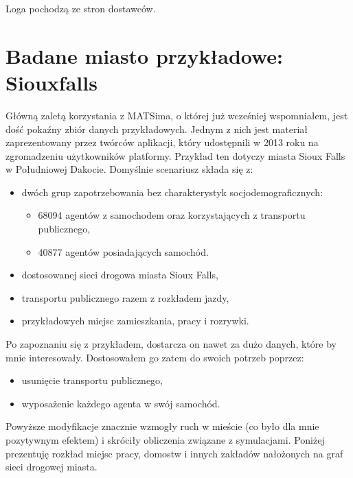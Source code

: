 \documentclass[twoside,12pt]{report}
\begin{document}
Loga pochodzą ze stron dostawców\cite{java}\cite{eclipse}\cite{python}\cite{pydev}.

\section{Badane miasto przykładowe: Siouxfalls}

Główną zaletą korzystania z MATSima, o której już wcześniej wspomniałem, jest dość pokaźny zbiór danych przykładowych. Jednym z nich jest materiał zaprezentowany przez twórców aplikacji, który udostępnili w 2013 roku na zgromadzeniu użytkowników platformy\cite{siux}. Przykład ten dotyczy miasta Sioux Falls w Południowej Dakocie. Domyślnie scenariusz składa się z:

\begin{itemize}
\item dwóch grup zapotrzebowania bez charakterystyk socjodemograficznych:
\begin{itemize}
\item 68094 agentów z samochodem oraz korzystających z transportu publicznego,
\item 40877 agentów posiadających samochód.
\end{itemize}
\item dostosowanej sieci drogowa miasta Sioux Falls,
\item transportu publicznego razem z rozkładem jazdy,
\item przykładowych miejsc zamieszkania, pracy i rozrywki.
\end{itemize}

\vspace*{20px}
Po zapoznaniu się z przykładem, dostarcza on nawet za dużo danych, które by mnie interesowały. Dostosowałem go zatem do swoich potrzeb poprzez:

\begin{itemize}
\item usunięcie transportu publicznego,
\item wyposażenie każdego agenta w swój samochód.
\end{itemize}

Powyższe modyfikacje znacznie wzmogły ruch w mieście (co było dla mnie pozytywnym efektem) i skróciły obliczenia związane z symulacjami. Poniżej prezentuję  rozkład miejsc pracy, domostw i innych zakładów nałożonych na graf sieci drogowej miasta.
\end{document}
